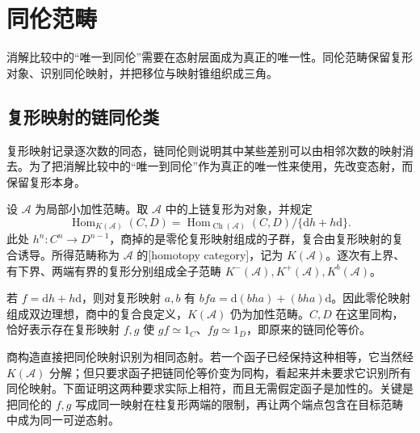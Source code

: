 
\section{同伦范畴}
\label{b4:sec:1601}

消解比较中的“唯一到同伦”需要在态射层面成为真正的唯一性。同伦范畴保留复形对象、识别同伦映射，并把移位与映射锥组织成三角。


%
%

\subsection{复形映射的链同伦类}
\label{b4:subsec:1601:01}

复形映射记录逐次数的同态，链同伦则说明其中某些差别可以由相邻次数的映射消去。为了把消解比较中的“唯一到同伦”作为真正的唯一性来使用，先改变态射，而保留复形本身。

\begin{definition}\label{b4:def:homotopy-category}
	设 \(\mathcal A\) 为局部小加性范畴。取 \(\mathcal A\) 中的上链复形为对象，并规定
	\[
		\operatorname{Hom}_{K(\mathcal A)}(C,D) =\operatorname{Hom}_{\operatorname{Ch}(\mathcal A)}(C,D)/\{\mathrm{d}h+h\mathrm{d}\}.
	\]
	此处 \(h^n:C^n\to D^{n-1}\)，商掉的是零伦复形映射组成的子群，复合由复形映射的复合诱导。所得范畴称为 \(\mathcal A\) 的[homotopy category]，记为 \(K(\mathcal A)\)。逐次有上界、有下界、两端有界的复形分别组成全子范畴 \(K^-(\mathcal A),K^+(\mathcal A),K^b(\mathcal A)\)。
\end{definition}

若 \(f=\mathrm{d}h+h\mathrm{d}\)，则对复形映射 \(a,b\) 有 \(bfa=\mathrm{d}(bha)+(bha)\mathrm{d}\)。因此零伦映射组成双边理想，商中的复合良定义，\(K(\mathcal A)\) 仍为加性范畴。\(C,D\) 在这里同构，恰好表示存在复形映射 \(f,g\) 使 \(gf\simeq1_C\)、\(fg\simeq1_D\)，即原来的链同伦等价。

\ProseParagraphBreak
商构造直接把同伦映射识别为相同态射。若一个函子已经保持这种相等，它当然经 \(K(\mathcal A)\) 分解；但只要求函子把链同伦等价变为同构，看起来并未要求它识别所有同伦映射。下面证明这两种要求实际上相符，而且无需假定函子是加性的。关键是把同伦的 \(f,g\) 写成同一映射在柱复形两端的限制，再让两个端点包含在目标范畴中成为同一可逆态射。

